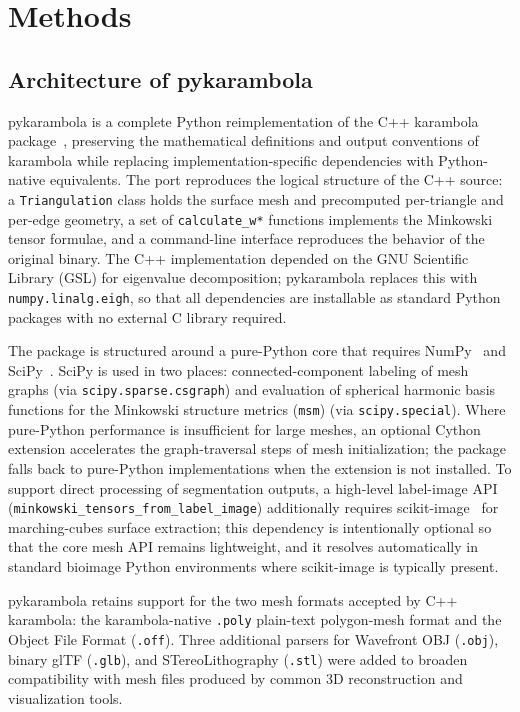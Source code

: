 \documentclass[times, twoside, watermark]{zHenriquesLab-StyleBioRxiv}
\begin{document}
\section*{Methods}

\subsection*{Architecture of pykarambola}
pykarambola is a complete Python reimplementation of the C++ karambola package~\cite{Schaller2020karambola}, preserving the mathematical definitions and output conventions of karambola while replacing implementation-specific dependencies with Python-native equivalents.
The port reproduces the logical structure of the C++ source: a \texttt{Triangulation} class holds the surface mesh and precomputed per-triangle and per-edge geometry, a set of \texttt{calculate\_w*} functions implements the Minkowski tensor formulae, and a command-line interface reproduces the behavior of the original binary.
The C++ implementation depended on the GNU Scientific Library (GSL) for eigenvalue decomposition; pykarambola replaces this with \texttt{numpy.linalg.eigh}, so that all dependencies are installable as standard Python packages with no external C library required.

The package is structured around a pure-Python core that requires NumPy~\cite{harris2020numpy} and SciPy~\cite{virtanen2020scipy}.
SciPy is used in two places: connected-component labeling of mesh graphs (via \texttt{scipy.sparse.csgraph}) and evaluation of spherical harmonic basis functions for the Minkowski structure metrics (\texttt{msm}) (via \texttt{scipy.special}).
Where pure-Python performance is insufficient for large meshes, an optional Cython extension accelerates the graph-traversal steps of mesh initialization; the package falls back to pure-Python implementations when the extension is not installed.
To support direct processing of segmentation outputs, a high-level label-image API (\texttt{minkowski\_tensors\_from\_label\_image}) additionally requires scikit-image~\cite{vanderwalt2014scikit} for marching-cubes surface extraction; this dependency is intentionally optional so that the core mesh API remains lightweight, and it resolves automatically in standard bioimage Python environments where scikit-image is typically present.

pykarambola retains support for the two mesh formats accepted by C++ karambola: the karambola-native \texttt{.poly} plain-text polygon-mesh format and the Object File Format (\texttt{.off}).
Three additional parsers for Wavefront OBJ (\texttt{.obj}), binary glTF (\texttt{.glb}), and STereoLithography (\texttt{.stl}) were added to broaden compatibility with mesh files produced by common 3D reconstruction and visualization tools.
\end{document}
